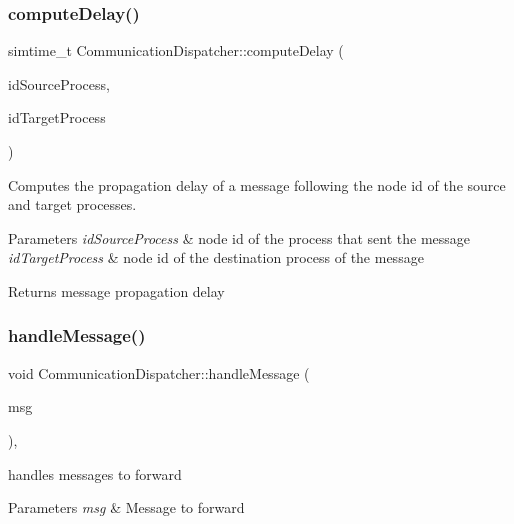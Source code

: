 \subsubsection{\texorpdfstring{compute\+Delay()}{computeDelay()}}
{\footnotesize\ttfamily simtime\+\_\+t Communication\+Dispatcher\+::compute\+Delay (\begin{DoxyParamCaption}\item[{unsigned int}]{id\+Source\+Process,  }\item[{unsigned int}]{id\+Target\+Process }\end{DoxyParamCaption})\hspace{0.3cm}{\ttfamily [private]}}



Computes the propagation delay of a message following the node id of the source and target processes. 


\begin{DoxyParams}{Parameters}
{\em id\+Source\+Process} & node id of the process that sent the message \\
\hline
{\em id\+Target\+Process} & node id of the destination process of the message \\
\hline
\end{DoxyParams}
\begin{DoxyReturn}{Returns}
message propagation delay 
\end{DoxyReturn}
\mbox{\label{class_communication_dispatcher_af7be3dbf46282e78d41d3d194f5ff246}} 
\subsubsection{\texorpdfstring{handle\+Message()}{handleMessage()}}
{\footnotesize\ttfamily void Communication\+Dispatcher\+::handle\+Message (\begin{DoxyParamCaption}\item[{c\+Message $\ast$}]{msg }\end{DoxyParamCaption})\hspace{0.3cm}{\ttfamily [private]}, {\ttfamily [virtual]}}



handles messages to forward 


\begin{DoxyParams}{Parameters}
{\em msg} & Message to forward \\
\hline
\end{DoxyParams}
\mbox{\label{class_communication_dispatcher_ab87c3d69a5953f9bda369d53c2de90d7}} 

